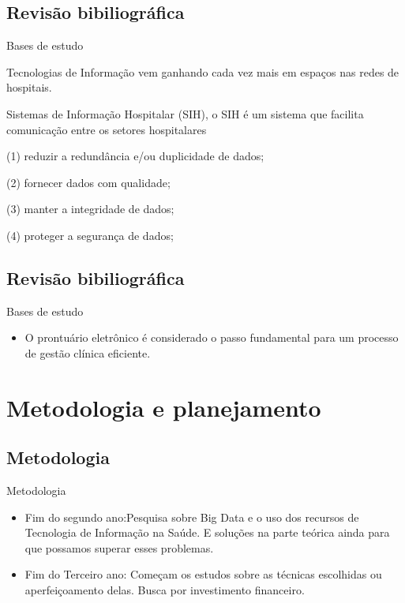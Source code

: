 \documentclass{beamer}
\begin{document}
\subsection{Revisão bibiliográfica}
\begin{frame}{Bases de estudo}
\begin{itemize}
    \item {Tecnologias de Informação vem ganhando cada vez mais em espaços nas redes de hospitais. }
    \item {Sistemas de Informação Hospitalar (SIH), o SIH é um sistema que facilita comunicação entre os setores hospitalares }
    \item {(1) reduzir a redundância e/ou duplicidade de dados; 
    \item (2) fornecer dados com qualidade; 
    \item (3) manter a integridade de dados;
    \item (4) proteger a segurança de dados; 
}
\end{itemize}
\end{frame}

\subsection{Revisão bibiliográfica}
\begin{frame}{Bases de estudo}
\begin{itemize}
    \item {O prontuário eletrônico é considerado o passo fundamental para um processo de gestão clínica eficiente. }
\end{itemize}
\end{frame}





\section{Metodologia e planejamento}
\subsection{Metodologia}
\begin{frame}{Metodologia}
    \begin{itemize}
        \item{Fim do segundo ano:Pesquisa sobre Big Data e o uso dos recursos de Tecnologia de Informação na Saúde. E soluções na parte teórica ainda para que possamos superar esses problemas.
        }
        \item{Fim do Terceiro ano: Começam os estudos sobre as técnicas escolhidas ou aperfeiçoamento delas. Busca por  investimento financeiro.}
    \end{itemize}
\end{frame}
\end{document}
